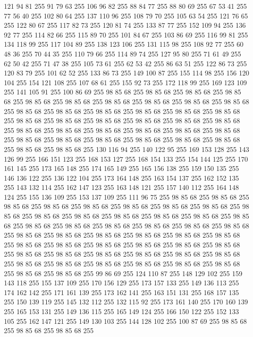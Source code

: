 121 94 81 255 91 79 63 255 106 96 82 255 88 84 77 255 88 80 69 255 67 53 41 255 77 56 40 255 102 80 64 255 137 110 96 255 108 79 70 255 105 63 54 255 121 76 65 255 122 80 67 255 117 82 73 255 120 81 74 255 133 87 77 255 152 109 94 255 136 92 77 255 114 82 66 255 115 89 70 255 101 84 67 255 103 86 69 255 116 99 81 255 134 118 99 255 117 104 89 255 138 123 106 255 131 115 98 255 108 92 77 255 60 48 36 255 70 44 35 255 110 79 66 255 114 89 74 255 127 95 80 255 71 61 49 255 62 50 42 255 71 47 38 255 105 73 61 255 62 53 42 255 86 63 51 255 122 86 73 255 120 83 79 255 101 62 52 255 133 86 73 255 149 100 87 255 155 114 98 255 156 120 104 255 154 121 108 255 107 68 61 255 155 92 73 255 172 118 99 255 169 123 109 255 141 105 91 255 100 86 69 255 98 85 68 255 98 85 68 255 98 85 68 255 98 85 68 255 98 85 68 255 98 85 68 255 98 85 68 255 98 85 68 255 98 85 68 255 98 85 68 255 98 85 68 255
98 85 68 255 98 85 68 255 98 85 68 255 98 85 68 255 98 85 68 255 98 85 68 255 98 85 68 255 98 85 68 255 98 85 68 255 98 85 68 255 98 85 68 255 98 85 68 255 98 85 68 255 98 85 68 255 98 85 68 255 98 85 68 255 98 85 68 255 98 85 68 255 98 85 68 255 98 85 68 255 98 85 68 255 98 85 68 255 98 85 68 255 98 85 68 255 98 85 68 255 130 116 94 255 140 122 95 255 169 153 128 255 143 126 99 255 166 151 123 255 168 153 127 255 168 154 133 255 154 144 125 255 170 161 145 255 173 165 148 255 174 165 149 255 165 156 138 255 159 150 135 255 146 136 122 255 136 122 104 255 173 164 148 255 163 154 137 255 162 152 135 255 143 132 114 255 162 147 123 255 163 148 121 255 157 140 112 255 164 148 124 255 155 136 109 255 153 137 109 255 111 96 75 255 98 85 68 255 98 85 68 255 98 85 68 255 98 85 68 255 98 85 68 255 98 85 68 255 98 85 68 255 98 85 68 255 98 85 68 255 98 85 68 255 98 85 68 255 98 85 68 255 98 85 68 255
98 85 68 255 98 85 68 255 98 85 68 255 98 85 68 255 98 85 68 255 98 85 68 255 98 85 68 255 98 85 68 255 98 85 68 255 98 85 68 255 98 85 68 255 98 85 68 255 98 85 68 255 98 85 68 255 98 85 68 255 98 85 68 255 98 85 68 255 98 85 68 255 98 85 68 255 98 85 68 255 98 85 68 255 98 85 68 255 98 85 68 255 98 85 68 255 98 85 68 255 98 85 68 255 98 85 68 255 98 85 68 255 98 85 68 255 98 85 68 255 98 85 68 255 98 85 68 255 98 85 68 255 98 85 68 255 99 86 69 255 124 110 87 255 148 129 102 255 159 143 118 255 155 137 109 255 170 156 129 255 173 157 133 255 149 136 113 255 174 162 142 255 171 161 139 255 173 162 141 255 163 151 131 255 168 157 135 255 150 139 119 255 145 132 112 255 132 115 92 255 173 161 140 255 170 160 139 255 165 153 131 255 149 136 115 255 165 149 124 255 166 150 122 255 152 133 105 255 162 147 121 255 149 130 103 255 144 128 102 255 100 87 69 255 98 85 68 255 98 85 68 255 98 85 68 255
